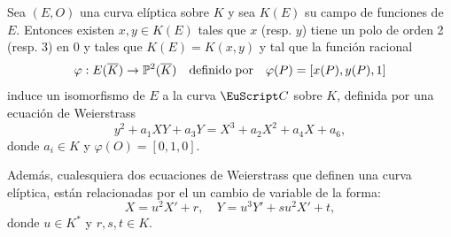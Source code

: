 \documentclass[../../tesis_maestria]{subfiles}
\begin{document}
\begin{thm}\label{thm:eq-weierstrass-E}
	Sea $(E,O)$ una curva elíptica sobre $K$ y sea $K(E)$ su campo de funciones de $E$. Entonces existen $x,y\in K(E)$ tales que $x$ (resp. $y$) tiene un polo de orden 2 (resp. 3) en $0$ y tales que $K(E)=K(x,y)$ y tal que la función racional
	\[
		\varphi:E(\overline{K})\rightarrow\mathbb{P}^2(\overline{K})\quad\mathrm{definido}\;\mathrm{por}\quad \varphi(P)=[x(P),y(P),1] 
	\]
	induce un isomorfismo de $E$ a la curva $\Cc$ sobre $K$, definida por una ecuación de Weierstrass
	\begin{equation}\label{eq:weierstrass-asociada-E}
		y^2+a_1 XY+a_3Y=X^3+a_2X^2+a_4X+a_6,
	\end{equation}
	donde $a_i\in K$ y $\varphi(O)=[0,1,0]$.
	
	Además, cualesquiera dos ecuaciones de Weierstrass que definen una curva elíptica, están relacionadas por el un cambio de variable de la forma:
	\[
		X=u^2X'+r,\quad Y=u^3Y'+su^2X'+t,
	\]
	donde $u\in K^*$ y $r,s,t\in K$.
\end{thm}
\end{document}
